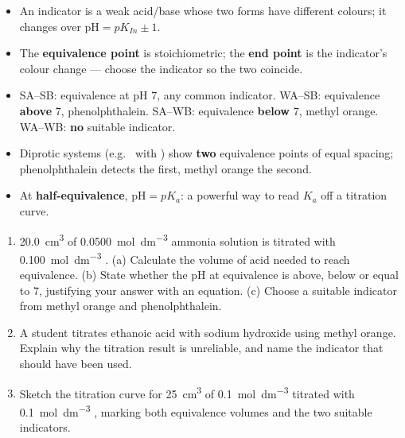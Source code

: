 \documentclass[11pt]{article}
\begin{document}
\begin{aretenir}
\begin{itemize}
\item An indicator is a weak acid/base whose two forms have different colours; it changes over $\mathrm{pH} = pK_{In}\pm1$.
\item The \textbf{equivalence point} is stoichiometric; the \textbf{end point} is the indicator's colour change — choose the indicator so the two coincide.
\item SA--SB: equivalence at pH 7, any common indicator. WA--SB: equivalence \textbf{above} 7, phenolphthalein. SA--WB: equivalence \textbf{below} 7, methyl orange. WA--WB: \textbf{no} suitable indicator.
\item Diprotic systems (e.g.\  with ) show \textbf{two} equivalence points of equal spacing; phenolphthalein detects the first, methyl orange the second.
\item At \textbf{half-equivalence}, $\mathrm{pH} = pK_a$: a powerful way to read $K_a$ off a titration curve.
\end{itemize}
\end{aretenir}

\begin{exercice}
\begin{enumerate}
\item \SI{20.0}{cm^3} of \SI{0.0500}{mol.dm^{-3}} ammonia solution is titrated with \SI{0.100}{mol.dm^{-3}} . (a) Calculate the volume of acid needed to reach equivalence. (b) State whether the pH at equivalence is above, below or equal to 7, justifying your answer with an equation. (c) Choose a suitable indicator from methyl orange and phenolphthalein.
\item A student titrates ethanoic acid with sodium hydroxide using methyl orange. Explain why the titration result is unreliable, and name the indicator that should have been used.
\item Sketch the titration curve for \SI{25}{cm^3} of \SI{0.1}{mol.dm^{-3}}  titrated with \SI{0.1}{mol.dm^{-3}} , marking both equivalence volumes and the two suitable indicators.
\end{enumerate}
\end{exercice}
\end{document}

